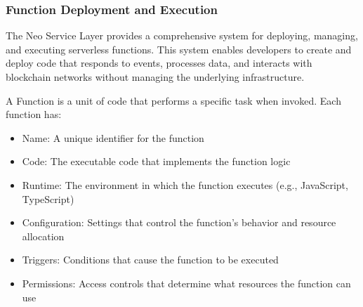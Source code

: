 \documentclass[12pt,a4paper]{article}
\begin{document}
\subsubsection{Function Deployment and Execution}
\label{subsubsec:function-deployment}

The Neo Service Layer provides a comprehensive system for deploying, managing, and executing serverless functions. This system enables developers to create and deploy code that responds to events, processes data, and interacts with blockchain networks without managing the underlying infrastructure.



\begin{definition}[Function]
A Function is a unit of code that performs a specific task when invoked. Each function has:
\begin{itemize}
    \item Name: A unique identifier for the function
    \item Code: The executable code that implements the function logic
    \item Runtime: The environment in which the function executes (e.g., JavaScript, TypeScript)
    \item Configuration: Settings that control the function's behavior and resource allocation
    \item Triggers: Conditions that cause the function to be executed
    \item Permissions: Access controls that determine what resources the function can use
\end{itemize}
\end{definition}
\end{document}
